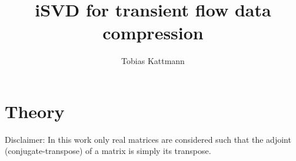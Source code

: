 \documentclass[10pt]{article}
\begin{document}
\title{iSVD for transient flow data compression}
\author{Tobias Kattmann}
\maketitle
\tableofcontents
\section{Theory}
Disclaimer: In this work only real matrices are considered such that the adjoint (conjugate-transpose) of a  matrix is simply its transpose.
\end{document}
